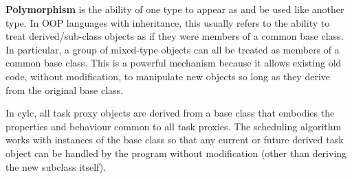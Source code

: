 \documentclass[11pt,a4paper]{article}
\begin{document}
{\bf Polymorphism} is the ability of one type to appear as and be used
like another type.  In OOP languages with inheritance, this usually
refers to the ability to treat derived/sub-class objects as if they were
members of a common base class. In particular, a group of mixed-type
objects can all be treated as members of a common base class. 
This is a powerful mechanism because it allows existing old code,
without modification, to manipulate new objects so long as they 
derive from the original base class.

In cylc, all task proxy objects are derived from a base class that 
embodies the properties and behaviour common to all task proxies. 
The scheduling algorithm works with instances of the base class so that
any current or future derived task object can be handled by the program
without modification (other than deriving the new subclass itself).


%
%


\end{document}
